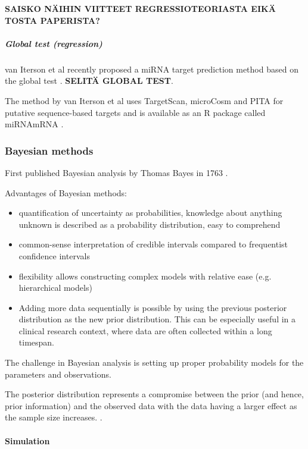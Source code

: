 \textbf{SAISKO NÄIHIN VIITTEET REGRESSIOTEORIASTA EIKÄ TOSTA PAPERISTA?}


\subparagraph{Global test (regression)}\label{global-test-regression}

van Iterson et al recently proposed a miRNA target prediction method based on
the global test \citep{vanIterson2013}. \textbf{SELITÄ GLOBAL TEST}.

The method by van Iterson et al uses TargetScan, microCosm and PITA for
putative sequence-based targets and is available as an R package called
miRNAmRNA \citep{vanItersonWeb}.





\subsubsection{Bayesian methods}\label{bayesian-methods}

First published Bayesian analysis by Thomas Bayes in 1763 \citep{Gelman2013}.

Advantages of Bayesian methods:
\begin{itemize}
  \item
  quantification of uncertainty as probabilities, knowledge about anything
  unknown is described as a probability distribution, easy to comprehend
  \item
  common-sense interpretation of credible intervals compared to frequentist
  confidence intervals
  \item
  flexibility allows constructing complex models with relative ease (e.g.
  hierarchical models)
  \item
  Adding more data sequentially is possible by using the previous posterior
  distribution as the new prior distribution. This can be especially useful in
  a clinical research context, where data are often collected within a long
  timespan.
\end{itemize}
The challenge in Bayesian analysis is setting up proper probability models for
the parameters and observations. \citep{Gelman2013}

The posterior distribution represents a compromise between the prior (and
hence, prior information) and the observed data with the data having a larger
effect as the sample size increases. \citep{Gelman2013}.


\paragraph{Simulation}\label{simulation}

